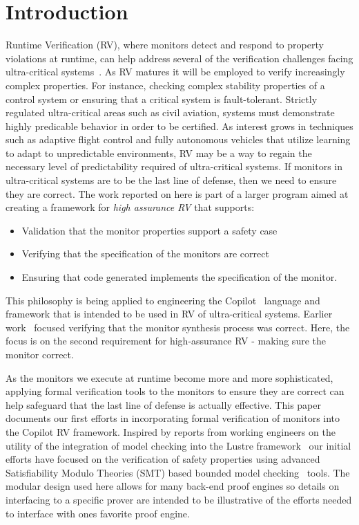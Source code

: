 \section{Introduction}\label{sec:intro}
Runtime Verification (RV), where monitors detect and respond to
property violations at runtime, can help address several of the
verification challenges facing ultra-critical
systems~\cite{pike-rv-11}.  As RV matures it will be employed to
verify increasingly complex properties. For instance, checking complex
stability properties of a control system or ensuring that a critical
system is fault-tolerant.  Strictly regulated ultra-critical areas
such as civil aviation, systems must demonstrate highly predicable
behavior in order to be certified. As interest grows in techniques
such as adaptive flight control and fully autonomous vehicles that
utilize learning to adapt to unpredictable environments, RV may be a
way to regain the necessary level of predictability required of
ultra-critical systems.  If monitors in ultra-critical
systems are to be the last line of defense, then we need to ensure
they are correct. The work reported on here is part of a larger
program aimed at creating a framework for \emph{high assurance RV}
that supports: 
\begin{itemize}
\item Validation that the monitor properties support a safety
case
\item Verifying that the specification of the monitors are correct
\item Ensuring that code generated implements the specification of the
monitor. 
\end{itemize} 
 This philosophy is being applied to engineering the
Copilot~\cite{copilot,pike-isse-13} language and framework that is
intended to be used in RV of ultra-critical systems.  Earlier
work~\cite{pike-icfp-12} focused verifying that the monitor synthesis
process was correct. Here, the focus is on the second requirement for
high-assurance RV - making sure the monitor  correct. 

                                     
 As the monitors we execute at runtime become more and more
sophisticated, applying formal verification tools to the monitors to
ensure they are correct can help safeguard that the last line of
defense is actually effective.   This paper documents our first efforts
in incorporating formal verification of monitors  into the Copilot RV framework.
Inspired by reports from working engineers on the utility of the
integration of model checking into the Lustre framework~\cite{Hagen08}
our initial efforts have focused on the verification of safety
properties using advanced Satisfiability Modulo Theories (SMT) based
bounded model checking~\cite{ClarkeBounded01} tools. The modular
design used here allows for many back-end proof engines so details on
interfacing to a specific prover are intended to be illustrative of
the efforts needed to interface with ones favorite proof engine. 


